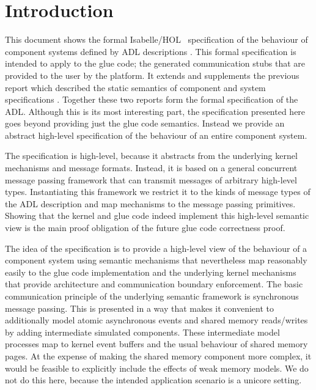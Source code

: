 %
%
%

\chapter{Introduction}
\label{s:intro}

This document shows the formal Isabelle/HOL~\cite{Nipkow_PW:Isabelle}
specification of the behaviour of \camkes
component systems defined by ADL descriptions \cite{Kuz_LGH_07}.
This formal specification is intended to apply to the glue code; the generated
communication stubs that are provided to the user by the \camkes platform.
It extends and supplements the previous
report which described the static semantics of component and system
specifications \cite{Kuz_FKM_12}.
Together these two reports form the formal specification of the \camkes ADL.
Although this is its most interesting part, the specification presented here
goes beyond providing just the glue code semantics. Instead we provide an
abstract high-level specification of the behaviour of an entire \camkes
component system.

The specification is high-level, because it abstracts from the underlying
kernel mechanisms and message formats. Instead, it is based on a general
concurrent message passing framework that can transmit messages of arbitrary
high-level types. Instantiating this framework we restrict it to the kinds of
message types of the ADL description and map \camkes mechanisms to the
message passing primitives. Showing that the kernel and glue code indeed
implement this high-level semantic view is the main proof obligation of the
future glue code correctness proof.

The idea of the specification is to provide a high-level view of the behaviour
of a component system using semantic mechanisms that nevertheless map
reasonably easily to the glue code implementation and the underlying kernel
mechanisms that provide architecture and communication boundary enforcement.
The basic communication principle of the underlying semantic framework is
synchronous message passing. This is presented in a way that makes it convenient to
additionally model atomic asynchronous events and shared memory reads/writes by
adding intermediate simulated components. These intermediate model processes map to
kernel event buffers and the usual behaviour of shared memory
pages. At the expense of making the shared memory component more complex, it
would be feasible to explicitly include the effects of
weak memory models. We do not do this here, because the intended application
scenario is a unicore setting.


